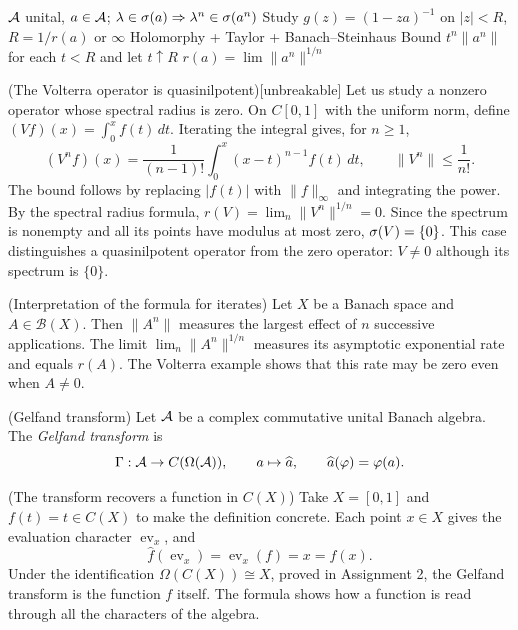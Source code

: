 \proofdiagrambranch
{$\mathcal A$ unital, $a\in\mathcal A$; $\lambda\in\sigma(a)\Rightarrow\lambda^n\in\sigma(a^n)$}
{Study $g(z)=(1-za)^{-1}$ on $|z|<R$, $R=1/r(a)$ or $\infty$}
{Holomorphy + Taylor + Banach--Steinhaus}
{Bound $t^n\|a^n\|$ for each $t<R$ and let $t\uparrow R$}
{$r(a)=\lim\|a^n\|^{1/n}$}

\begin{cthejemplo}{(The Volterra operator is quasinilpotent)}[unbreakable]
Let us study a nonzero operator whose spectral radius is zero.
On $C[0,1]$ with the uniform norm, define
$(Vf)(x)=\int_0^x f(t)\,dt$. Iterating the integral gives, for
$n\ge1$,
\[
 (V^nf)(x)=\frac1{(n-1)!}\int_0^x(x-t)^{n-1}f(t)\,dt,
 \qquad \|V^n\|\le\frac1{n!}.
\]
The bound follows by replacing $|f(t)|$ with $\|f\|_\infty$
and integrating the power.
By the spectral radius formula,
$r(V)=\lim_n\|V^n\|^{1/n}=0$.
Since the spectrum is nonempty and all its points have modulus
at most zero, $\sigma(V)=\{0\}$.
This case distinguishes a quasinilpotent operator from the zero operator:
$V\ne0$ although its spectrum is $\{0\}$.
\end{cthejemplo}

\begin{cthnota}{(Interpretation of the formula for iterates)}
Let $X$ be a Banach space and $A\in\mathcal B(X)$. Then $\|A^n\|$
measures the largest effect of $n$ successive
applications. The limit $\lim_n\|A^n\|^{1/n}$ measures its asymptotic exponential rate and
equals $r(A)$. The Volterra example shows that this rate may be zero
even when $A\ne0$.
\end{cthnota}

\begin{cthdefinicion}{(Gelfand transform)}
Let $\mathcal A$ be a complex commutative unital Banach algebra.
The \emph{Gelfand transform} is
\[
 \Gamma:\mathcal A\to C(\Omega(\mathcal A)),\qquad
 a\mapsto\widehat a,\qquad \widehat a(\varphi)=\varphi(a).
\]
\end{cthdefinicion}

\begin{cthejemplo}{(The transform recovers a function in $C(X)$)}
Take $X=[0,1]$ and $f(t)=t\in C(X)$ to make the definition concrete.
Each point $x\in X$ gives the evaluation character
$\operatorname{ev}_x$, and
\[
 \widehat f(\operatorname{ev}_x)
 =\operatorname{ev}_x(f)=x=f(x).
\]
Under the identification $\Omega(C(X))\cong X$, proved in Assignment 2,
the Gelfand transform is the function $f$ itself.
The formula shows how a function is read through all the
characters of the algebra.
\end{cthejemplo}

